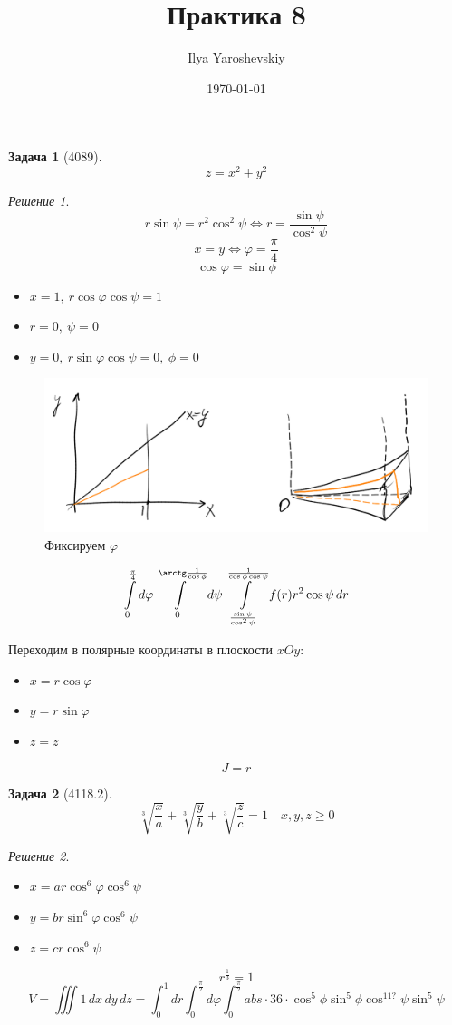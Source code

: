 \documentclass[english]{article}
\author{Ilya Yaroshevskiy}
\date{\today}
\title{Практика 8}
\theoremstyle{plain}
\theoremstyle{remark}
\newtheorem*{solution}{Решение}
\theoremstyle{definition}
\newtheorem{task}{Задача}
\begin{document}
\maketitle
\tableofcontents

\begin{task}[4089]
\[ z = x^2 + y^2 \]
\end{task}
\begin{solution}
\[ r\sin\psi = r^2\cos^2\psi \Leftrightarrow r = \frac{\sin\psi}{\cos^2\psi} \]
\[ x = y \Leftrightarrow \varphi = \frac{\pi}{4} \]
\[ \cos \varphi = \sin\phi \]
\begin{itemize}
\item \(x = 1,\ r\cos\varphi\cos\psi = 1\)
\item \(r = 0,\ \psi = 0\)
\item \(y = 0,\ r\sin\varphi\cos\psi = 0,\ \phi = 0\)
\end{itemize}
\begin{figure}[htbp]
\centering
\includegraphics[scale=0.3]{8_1.png}
\caption{Фиксируем \(\varphi\)}
\end{figure}
\[ \int\limits_0^{\frac{\pi}{4}}d\varphi\int\limits_0^{\arctg\frac{1}{\cos\phi}} d\psi \int\limits_{\frac{\sin\psi}{\cos^2\psi}}^{\frac{1}{\cos\phi\cos\psi}} f(r)r^2\cos\psi\,dr \]
\end{solution}
Переходим в полярные координаты в плоскости \(xOy\):
\begin{itemize}
\item \(x = r\cos\varphi\)
\item \(y = r\sin\varphi\)
\item \(z = z\)
\end{itemize}
\[J = r\]
\begin{task}[4118.2]
\[ \sqrt[3]{\frac{x}{a}} + \sqrt[3]{\frac{y}{b}} + \sqrt[3]{\frac{z}{c}} = 1 \quad x, y, z \ge 0 \]
\end{task}
\begin{solution}
\-
\begin{itemize}
\item \(x = ar\cos^6\varphi\cos^6\psi\)
\item \(y = br\sin^6\varphi\cos^6\psi\)
\item \(z = cr \cos^6\psi\)
\end{itemize}
\[ r^{\frac{1}{3}} = 1 \]
\[ V = \iiint 1\,dx\,dy\,dz = \int_0^1 dr \int_0^{\frac{\pi}{2}} d\varphi \int_0^{\frac{\pi}{2}} abs\cdot 36\cdot \cos^5\phi\sin^5\phi\cos^{11?}\psi\sin^5\psi\]
\end{solution}
\end{document}
